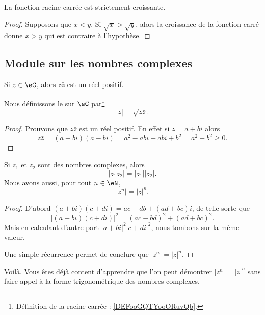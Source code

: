 \begin{lemma}       \label{LEMooSBOAooOOIotR}
	La fonction racine carrée est strictement croissante.
\end{lemma}

\begin{proof}
	Supposons que \( x<y\). Si \( \sqrt{ x }>\sqrt{ y }\), alors la croissance de la fonction carré donne \( x>y\) qui est contraire à l'hypothèse.
\end{proof}

\subsection{Module sur les nombres complexes}

\begin{lemmaDef}        \label{LEMooVHDAooJyoakR}
	Si \( z\in \eC\), alors \( z\bar z\) est un réel positif.

	Nous définissons le  sur \( \eC\) par\footnote{Définition de la racine carrée : \ref{DEFooGQTYooORuvQb}.}
	\begin{equation}
		| z |=\sqrt{ z\bar z }.
	\end{equation}
\end{lemmaDef}

\begin{proof}
	Prouvons que \( z\bar z\) est un réel positif. En effet si \( z=a+bi\) alors
	\begin{equation}
		z\bar z=(a+bi)(a-bi)=a^2-abi+abi+b^2=a^2+b^2\geq 0.
	\end{equation}
\end{proof}


\begin{proposition} \label{PROPooXLARooYSDCsF}
	Si \( z_1\) et \( z_2\) sont des nombres complexes, alors
	\begin{equation}
		| z_1z_2 |=| z_1 | |z_2 |.
	\end{equation}
	Nous avons aussi, pour tout \( n\in \eN\),
	\begin{equation}       \label{EQooATTQooRpJeCo}
		| z^n |=| z |^n.
	\end{equation}
\end{proposition}

\begin{proof}
	D'abord \( (a+bi)(c+di)=ac-db+(ad+bc)i\), de telle sorte que
	\begin{equation}
		| (a+bi)(c+di) |^2=(ac-bd)^2+(ad+bc)^2.
	\end{equation}
	Mais en calculant d'autre part \( | a+bi |^2| c+di |^2\), nous tombons sur la même valeur.

	Une simple récurrence permet de conclure que \( | z^n |=| z |^n\).
\end{proof}
Voilà. Vous êtes déjà content d'apprendre que l'on peut démontrer \( | z^n |=| z |^n\) sans faire appel à la forme trigonométrique des nombres complexes.



